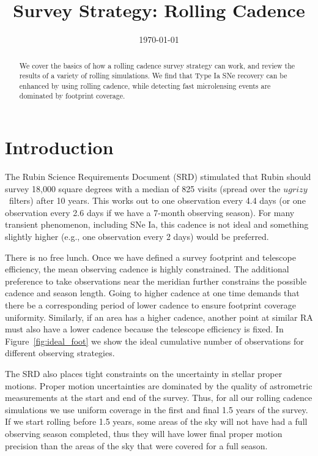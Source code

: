 \documentclass[modern]{aastex62}
\begin{document}

\date{\today}
\title{Survey Strategy: Rolling Cadence}

\begin{abstract}
We cover the basics of how a rolling cadence survey strategy can work, and review the results of a variety of rolling simulations. We find that Type Ia SNe recovery can be enhanced by using rolling cadence, while detecting fast microlensing events are dominated by footprint coverage.
\end{abstract}

\section{Introduction}

The Rubin Science Requirements Document (SRD) stimulated that Rubin should survey 18,000 square degrees with a median of 825 visits (spread over the $ugrizy$\ filters) after 10 years. This works out to one observation every 4.4 days (or one observation every 2.6 days if we have a 7-month observing season). For many transient phenomenon, including SNe Ia, this cadence is not ideal and something slightly higher (e.g., one observation every 2 days) would be preferred. 

There is no free lunch. Once we have defined a survey footprint and telescope efficiency, the mean observing cadence is highly constrained. The additional preference to take observations near the meridian further constrains the possible cadence and season length. Going to higher cadence at one time demands that there be a corresponding period of lower cadence to ensure footprint coverage uniformity. Similarly, if an area has a higher cadence, another point at similar RA must also have a lower cadence because the telescope efficiency is fixed.  In Figure~\ref{fig:ideal_foot} we show the ideal cumulative number of observations for different observing strategies. 

The SRD also places tight constraints on the uncertainty in stellar proper motions. Proper motion uncertainties are dominated by the quality of astrometric measurements at the start and end of the survey. Thus, for all our rolling cadence simulations we use uniform coverage in the first and final 1.5 years of the survey. If we start rolling before 1.5 years, some areas of the sky will not have had a full observing season completed, thus they will have lower final proper motion precision than the areas of the sky that were covered for a full season.
\end{document}
